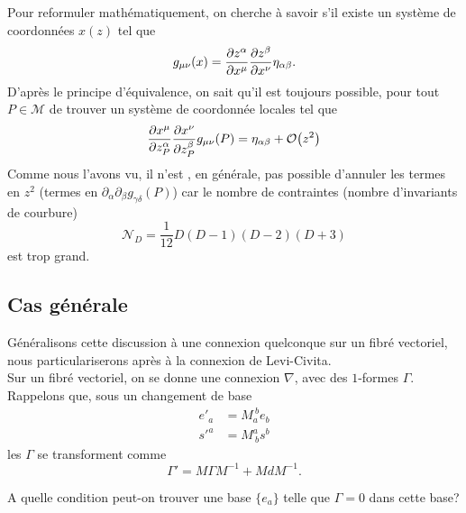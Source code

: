 \documentclass[a4paper,11pt]{report}
\theoremstyle{definition}
\theoremstyle{plain}
\theoremstyle{definition}
\theoremstyle{remark}
\newcommand{\M}{\mathscr{M}}
\newcommand{\p}{\partial}
\begin{document}
            Pour reformuler mathématiquement, on cherche à savoir s'il existe un système de coordonnées $x(z)$ tel que
            \begin{equation}
                g_{\mu\nu}(x) = \pdv{z^\alpha}{x^\mu}\pdv{z^\beta}{x^\nu}\eta_{\alpha\beta}.
            \end{equation}
            D'après le principe d'équivalence, on sait qu'il est toujours possible, pour tout $P\in\M$ de trouver un système de coordonnée locales tel que
            \begin{equation}
                \pdv{x^\mu}{z^\alpha_P}\pdv{x^\nu}{z^\beta_P}g_{\mu\nu}(P) = \eta_{\alpha\beta} + \order{z^2}
            \end{equation}
            Comme nous l'avons vu, il n'est , en générale, pas possible d'annuler les termes en $z^2$ (termes en $\p_\alpha\p_\beta g_{\gamma\delta}(P)$) car le nombre de contraintes (nombre d'invariants de courbure)
            \begin{equation}
                \mathscr{N}_D = \frac{1}{12}D(D-1)(D-2)(D+3)
            \end{equation}
            est trop grand.
            
            \subsection{Cas générale}
            
                Généralisons cette discussion à une connexion quelconque sur un fibré vectoriel, nous particulariserons après à la connexion de Levi-Civita.\\
                
                Sur un fibré vectoriel, on se donne une connexion $\nabla$, avec des $1$-formes $\Gamma$. Rappelons que, sous un changement de base
                \begin{align}
                    e'_a &= M_a^{~b}e_b \\
                    s'^a &= M^a_{~b}s^b
                \end{align}
                les $\Gamma$ se transforment comme
                \begin{equation}
                    \Gamma' = M\Gamma M^{-1} + MdM^{-1}.
                \end{equation}
                
                A quelle condition peut-on trouver une base $\{e_a\}$ telle que $\Gamma = 0$ dans cette base?
                
\end{document}

